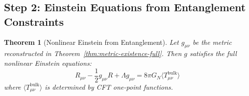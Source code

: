 \documentclass[12pt,a4paper]{article}
\newtheorem{theorem}{Theorem}[section]
\begin{document}
\subsection{Step 2: Einstein Equations from Entanglement Constraints}

\begin{theorem}[Nonlinear Einstein from Entanglement]\label{thm:nonlinear-einstein-full}
Let $g_{\mu\nu}$ be the metric reconstructed in Theorem~\ref{thm:metric-existence-full}. Then $g$ satisfies the full nonlinear Einstein equations:
\begin{equation}
R_{\mu\nu} - \frac{1}{2}g_{\mu\nu} R + \Lambda g_{\mu\nu} = 8\pi G_N \langle T_{\mu\nu}^{\text{bulk}} \rangle
\end{equation}
where $\langle T_{\mu\nu}^{\text{bulk}} \rangle$ is determined by CFT one-point functions.
\end{theorem}
\end{document}
